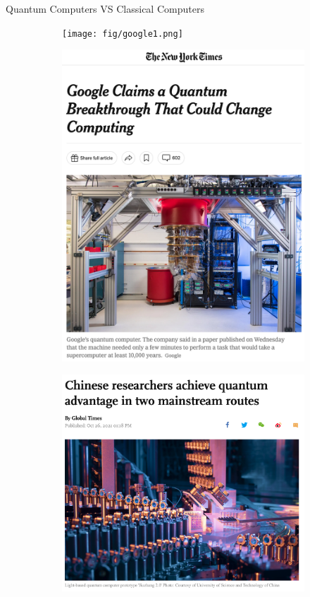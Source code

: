 \documentclass[10pt]{beamer}
\begin{document}
\begin{CJK}{UTF8}{gbsn}
\begin{frame}[fragile]{Quantum Computers VS Classical Computers}
\begin{figure}
  \centering
  \begin{subfigure}[b]{0.2\textwidth}
    \texttt{[image: fig/google1.png]}
  \end{subfigure}
  \hfill
  \begin{subfigure}[b]{0.3\textwidth}
    \includegraphics[width=\textwidth]{fig/newyorktimes.png}
  \end{subfigure}
  \hfill
  \begin{subfigure}[b]{0.4\textwidth}
    \includegraphics[width=\textwidth]{fig/chinatimes.png}

\end{subfigure}
\end{figure}
\end{frame}
\end{CJK}
\end{document}
